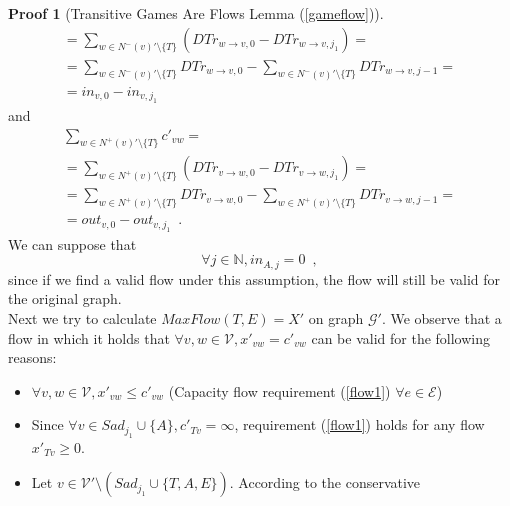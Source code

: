 \documentclass[11pt]{llncs}
\theoremstyle{definition}
\newtheorem{sepproof}{Proof}
\begin{document}
\begin{sepproof}[Transitive Games Are Flows Lemma (\ref{gameflow})]
\begin{equation}
\begin{gathered}
          = \sum\limits_{w \in N^{-}\left(v\right)' \setminus \{T\}}\left(DTr_{w \rightarrow v, 0} -
          DTr_{w \rightarrow v, j_1}\right) = \\
          = \sum\limits_{w \in N^{-}\left(v\right)' \setminus \{T\}}DTr_{w \rightarrow v, 0} -
          \sum\limits_{w \in N^{-}\left(v\right)' \setminus \{T\}}DTr_{w \rightarrow v, j-1} =  \\
          = in_{v, 0} - in_{v, j_1}
       \end{gathered}
       \end{equation}
       and
       \begin{equation}
       \label{gameflowout}
       \begin{gathered}
          \sum\limits_{w \in N^{+}\left(v\right)' \setminus \{T\}}c'_{vw} = \\
          = \sum\limits_{w \in N^{+}\left(v\right)' \setminus \{T\}}\left(DTr_{v \rightarrow w, 0} -
          DTr_{v \rightarrow w, j_1}\right) = \\
          = \sum\limits_{w \in N^{+}\left(v\right)' \setminus \{T\}}DTr_{v \rightarrow w, 0} -
          \sum\limits_{w \in N^{+}\left(v\right)' \setminus \{T\}}DTr_{v \rightarrow w, j-1} = \\
          = out_{v, 0} - out_{v, j_1} \enspace.
       \end{gathered}
       \end{equation}
       We can suppose that
       \begin{equation}
       \label{Aincoming}
          \forall j \in \mathbb{N}, in_{A, j} = 0 \enspace,
       \end{equation}
       since if we find a valid flow under this assumption, the flow will still be valid for the original graph. \\
       Next we try to calculate $MaxFlow\left(T, E\right) = X'$ on graph $\mathcal{G}'$. We observe that a flow in which it
       holds that $\forall v, w \in \mathcal{V}, x'_{vw} = c'_{vw}$ can be valid for the following reasons:
       \begin{itemize}
          \item $\forall v,w \in \mathcal{V}, x'_{vw} \leq c'_{vw}$ (Capacity flow requirement (\ref{flow1}) $\forall e \in
          \mathcal{E}$)
          \item Since $\forall v \in Sad_{j_1} \cup \{A\}, c'_{Tv} = \infty$, requirement (\ref{flow1}) holds for any flow
          $x'_{Tv} \geq 0$.
          \item Let $v \in \mathcal{V}' \setminus \left(Sad_{j_1} \cup \{T, A, E\}\right)$. According to the conservative

\end{itemize}
\end{sepproof}
\end{document}
